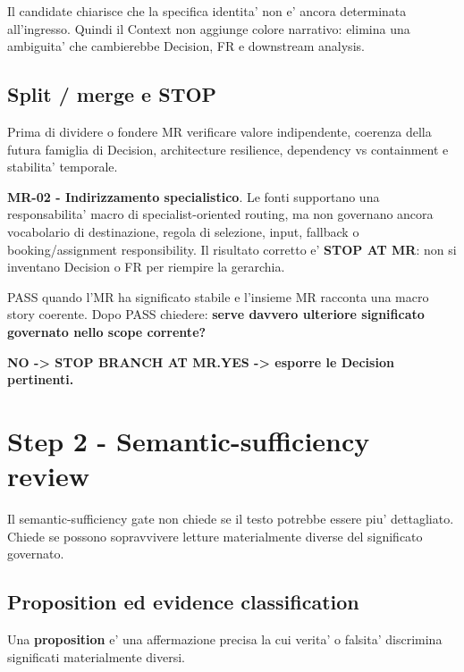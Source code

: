 \documentclass[11pt,a4paper]{article}
\begin{document}
Il candidate chiarisce che la specifica identita' non e' ancora determinata all'ingresso. Quindi il Context non aggiunge colore narrativo: elimina una ambiguita' che cambierebbe Decision, FR e downstream analysis.

\subsection{Split / merge e STOP}

Prima di dividere o fondere MR verificare valore indipendente, coerenza della futura famiglia di Decision, architecture resilience, dependency vs containment e stabilita' temporale.

\begin{ddtaexample}[title={DermaTriage - STOP AT MR come risultato corretto}]
\textbf{MR-02 - Indirizzamento specialistico}. Le fonti supportano una responsabilita' macro di specialist-oriented routing, ma non governano ancora vocabolario di destinazione, regola di selezione, input, fallback o booking/assignment responsibility. Il risultato corretto e' \textbf{STOP AT MR}: non si inventano Decision o FR per riempire la gerarchia.
\end{ddtaexample}

\begin{ddtacheck}[title={Gate D1 - MR + STOP}]
PASS quando l'MR ha significato stabile e l'insieme MR racconta una macro story coerente. Dopo PASS chiedere: \textbf{serve davvero ulteriore significato governato nello scope corrente?}\par
\textbf{NO -> STOP BRANCH AT MR.}\quad \textbf{YES -> esporre le Decision pertinenti.}
\end{ddtacheck}

\section{Step 2 - Semantic-sufficiency review}
\workingtag

Il semantic-sufficiency gate non chiede se il testo potrebbe essere piu' dettagliato. Chiede se possono sopravvivere letture materialmente diverse del significato governato.

\subsection{Proposition ed evidence classification}

Una \textbf{proposition} e' una affermazione precisa la cui verita' o falsita' discrimina significati materialmente diversi.
\end{document}
